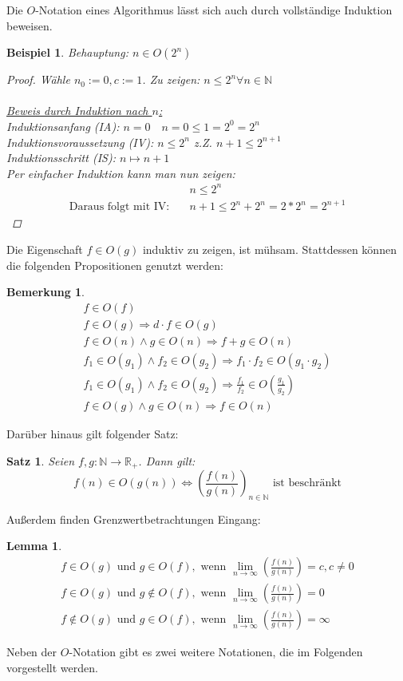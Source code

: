 \documentclass[11pt,a4paper]{scrartcl}
\newtheorem{note}{Bemerkung}
\newtheorem{satz}{Satz}
\newtheorem{lemma}{Lemma}
\newtheorem{example}{Beispiel}
\begin{document}
Die $O$-Notation eines Algorithmus lässt sich auch durch vollständige Induktion beweisen.
\begin{example}
Behauptung: $n \in O(2^{n})$
\begin{proof}
Wähle $n_{0} := 0, c:= 1$. Zu zeigen: $n \leq 2^{n} \forall n \in \mathbb{N}$\\\\
\uline{Beweis durch Induktion nach $n$:} \\
Induktionsanfang (IA): $n = 0 \quad n = 0 \leq 1 = 2^{0} = 2^{n}$ \\
Induktionsvoraussetzung (IV): $n \leq 2^{n}$ z.Z. $n+1 \leq 2^{n+1}$ \\
Induktionsschritt (IS): $n \mapsto n + 1$ \\
Per einfacher Induktion kann man nun zeigen: 
\begin{align}
& n \leq 2^{n} \\
\text{Daraus folgt mit IV:} \quad & n+1 \leq 2^{n} + 2^{n} = 2*2^{n} = 2^{n+1}
\end{align}
\end{proof}
\end{example} 
Die Eigenschaft $f \in O(g)$ induktiv zu zeigen, ist mühsam. Stattdessen können die folgenden Propositionen genutzt werden: 
\begin{note}
\begin{align}
f \in O(f) \\
f \in O(g) \Rightarrow d \cdot f \in O(g) \\
f \in O(n) \land g \in O(n) \Rightarrow f + g \in O(n) \\
f_{1} \in O(g_{1}) \land f_{2} \in O(g_{2}) \Rightarrow f_{1} \cdot f_{2} \in O(g_{1} \cdot g_{2}) \\
f_{1} \in O(g_{1}) \land f_{2} \in O(g_{2}) \Rightarrow \frac{f_{1}}{f_{2}} \in O(\frac{g_{1}}{g_{2}}) \\
f \in O(g) \land g \in O(n) \Rightarrow f \in O(n)
\end{align}
\end{note}
Darüber hinaus gilt folgender Satz: 
\begin{satz}
Seien $f, g: \mathbb{N} \to \mathbb{R_{+}}$. Dann gilt: \\
\[f(n) \in O(g(n)) \iff (\frac{f(n)}{g(n)})_{n \in \mathbb{N}} \text{ ist beschränkt}\]
\end{satz}
Außerdem finden Grenzwertbetrachtungen Eingang:
\begin{lemma}
\begin{align}
f \in O(g) \text{ und } g \in O(f), \text{ wenn } \lim \limits_{n \to \infty} (\frac{f(n)}{g(n)}) = c, c \neq 0 \\
f \in O(g) \text{ und } g \notin O(f), \text{ wenn } \lim \limits_{n \to \infty} (\frac{f(n)}{g(n)}) = 0 \\
f \notin O(g) \text{ und } g \in O(f), \text{ wenn } \lim \limits_{n \to \infty} (\frac{f(n)}{g(n)}) = \infty
\end{align}
\end{lemma}
Neben der $O$-Notation gibt es zwei weitere Notationen, die im Folgenden vorgestellt werden.
\end{document}
